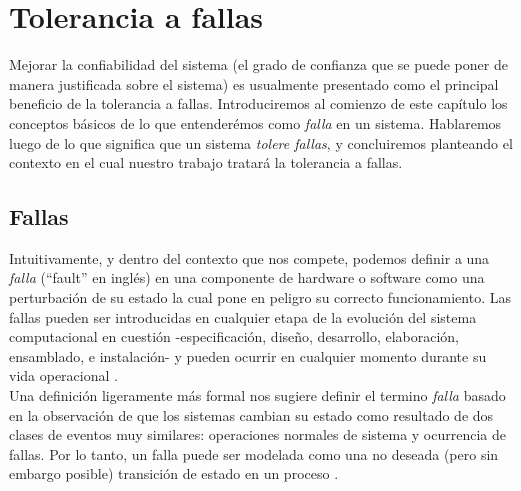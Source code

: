\documentclass[titlepage, 12pt]{book}
\begin{document}









\chapter{Tolerancia a fallas}

Mejorar la confiabilidad del sistema (el grado de confianza que se puede poner 
de manera justificada sobre el sistema) es usualmente presentado como el 
principal beneficio de la tolerancia a fallas. Introduciremos al comienzo de este cap\'itulo los conceptos b\'asicos de lo que entender\'emos como \textit{falla} en un sistema. Hablaremos luego de lo que significa que un sistema \textit{tolere fallas}, y concluiremos planteando el contexto en el cual nuestro trabajo tratar\'a la tolerancia a fallas.






\section{Fallas}
Intuitivamente, y dentro del contexto que nos compete, podemos definir a una \textit{falla} (``fault'' en ingl\'es) en una componente de hardware o software como una perturbaci\'on de su estado la cual pone en peligro su correcto funcionamiento. Las fallas pueden ser introducidas en cualquier etapa de la evoluci\'on del sistema computacional en cuesti\'on -especificaci\'on, dise\~no, desarrollo, elaboraci\'on, ensamblado, e instalaci\'on- y pueden ocurrir en cualquier momento durante su vida operacional \cite{FaultInject}.\\

Una definici\'on ligeramente m\'as formal nos sugiere definir el termino \textit{falla} basado en la observaci\'on de que los sistemas cambian su estado como resultado de dos clases de eventos muy similares: operaciones normales de sistema y ocurrencia de fallas. Por lo tanto, un falla puede ser modelada como una no deseada (pero sin embargo posible) transici\'on de estado en un proceso \cite{Felix}.\\
\end{document}

